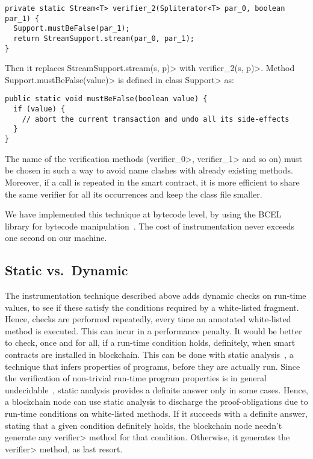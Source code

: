 {\small\begin{verbatim}
private static Stream<T> verifier_2(Spliterator<T> par_0, boolean par_1) {
  Support.mustBeFalse(par_1);
  return StreamSupport.stream(par_0, par_1);
}
\end{verbatim}}

\noindent
Then it replaces \<StreamSupport.stream(s, p)> with \<verifier\_2(s, p)>.
Method \<Support.mustBeFalse(value)> is defined in class \<Support> as:

{\small\begin{verbatim}
public static void mustBeFalse(boolean value) {
  if (value) {
    // abort the current transaction and undo all its side-effects
  }
}
\end{verbatim}}

The name of the verification methods (\<verifier\_0>, \<verifier\_1> and so on)
must be chosen in such a way to avoid name clashes with already existing methods.
Moreover, if a call is repeated
in the smart contract, it is more efficient to share the same verifier for all
its occurrences and keep the class file smaller.

We have implemented this technique at bytecode level, by using the BCEL
library for bytecode manipulation~\cite{bcel}. The cost of instrumentation never exceeds one
second on our machine.

\subsection{Static vs.\ Dynamic}\label{subsec:static_vs_dynamic}

The instrumentation technique described above adds dynamic checks on run-time values, to see
if these satisfy the conditions required by a white-listed fragment.
Hence, checks are performed repeatedly, every time an annotated white-listed method
is executed. This can incur in a performance penalty. It would be better
to check, once and for all,
if a run-time condition holds, definitely, when smart contracts
are installed in blockchain.
This can be done with static analysis~\cite{NielsonNH99}, a technique that infers
properties of programs, before they are actually run. Since the verification of
non-trivial run-time program properties is in general undecidable~\cite{Rice53},
static analysis provides a definite answer
only in some cases. Hence, a blockchain node can use static analysis to discharge
the proof-obligations due to run-time conditions on white-listed methods. If it
succeeds with a definite answer, stating that a given condition definitely holds,
the blockchain node needn't generate any \<verifier> method for that condition. Otherwise, it
generates the \<verifier> method, as last resort.


